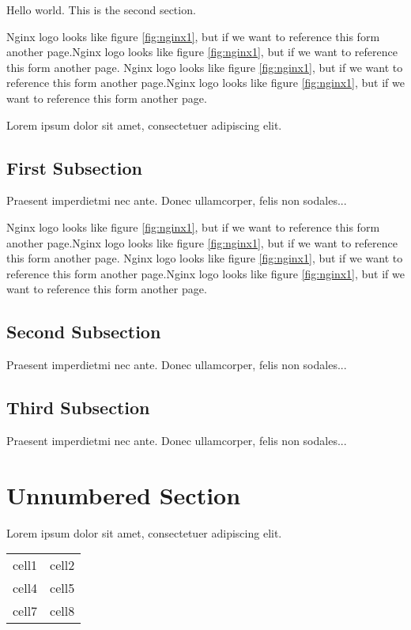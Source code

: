 \documentclass[10pt, a4paper]{article} %
\begin{document}
Hello world. This is the second section.

Nginx logo looks like figure \ref{fig:nginx1}, but if we want to reference this form another page.Nginx logo looks like figure \ref{fig:nginx1}, but if we want to reference this form another page.
Nginx logo looks like figure \ref{fig:nginx1}, but if we want to reference this form another page.Nginx logo looks like figure \ref{fig:nginx1}, but if we want to reference this form another page.

Lorem ipsum dolor sit amet, consectetuer adipiscing elit.

\subsection{First Subsection}

Praesent imperdietmi nec ante. Donec ullamcorper, felis non sodales...

Nginx logo looks like figure \ref{fig:nginx1}, but if we want to reference this form another page.Nginx logo looks like figure \ref{fig:nginx1}, but if we want to reference this form another page.
Nginx logo looks like figure \ref{fig:nginx1}, but if we want to reference this form another page.Nginx logo looks like figure \ref{fig:nginx1}, but if we want to reference this form another page.

\subsection{Second Subsection}
Praesent imperdietmi nec ante. Donec ullamcorper, felis non sodales...

\subsection{Third Subsection}
Praesent imperdietmi nec ante. Donec ullamcorper, felis non sodales...

\section*{Unnumbered Section}
Lorem ipsum dolor sit amet, consectetuer adipiscing elit.  

\begin{center} %
    \begin{tabular}{  c c }       
     cell1 & cell2 \\ 
     cell4 & cell5 \\  
     cell7 & cell8    
    \end{tabular}
\end{center}
\end{document}
